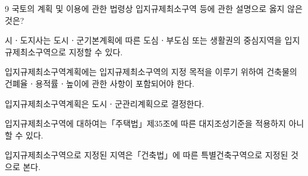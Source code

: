\begin{question}{9}
국토의 계획 및 이용에 관한 법령상 입지규제최소구역 등에 관한 설명으로 옳지 않은 것은?
\begin{choices}
  \item 시ㆍ도지사는 도시ㆍ군기본계획에 따른 도심ㆍ부도심 또는 생활권의 중심지역을 입지규제최소구역으로 지정할 수 있다.
  \item 입지규제최소구역계획에는 입지규제최소구역의 지정 목적을 이루기 위하여 건축물의 건폐율ㆍ용적률ㆍ높이에 관한 사항이 포함되어야 한다.
  \item 입지규제최소구역계획은 도시ㆍ군관리계획으로 결정한다.
  \item 입지규제최소구역에 대하여는「주택법」제35조에 따른 대지조성기준을 적용하지 아니할 수 있다.
  \item 입지규제최소구역으로 지정된 지역은「건축법」에 따른 특별건축구역으로 지정된 것으로 본다.
\end{choices}
\end{question}
